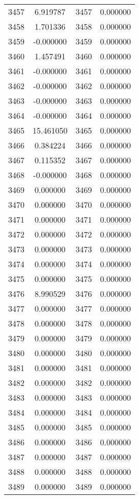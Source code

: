 \documentclass[12pt]{article}
\begin{document}
\begin{longtable}{@{}cccc@{}}
3457 & 6.919787 & 3457 & 0.000000 \\
3458 & 1.701336 & 3458 & 0.000000 \\
3459 & -0.000000 & 3459 & 0.000000 \\
3460 & 1.457491 & 3460 & 0.000000 \\
3461 & -0.000000 & 3461 & 0.000000 \\
3462 & -0.000000 & 3462 & 0.000000 \\
3463 & -0.000000 & 3463 & 0.000000 \\
3464 & -0.000000 & 3464 & 0.000000 \\
3465 & 15.461050 & 3465 & 0.000000 \\
3466 & 0.384224 & 3466 & 0.000000 \\
3467 & 0.115352 & 3467 & 0.000000 \\
3468 & -0.000000 & 3468 & 0.000000 \\
3469 & 0.000000 & 3469 & 0.000000 \\
3470 & 0.000000 & 3470 & 0.000000 \\
3471 & 0.000000 & 3471 & 0.000000 \\
3472 & 0.000000 & 3472 & 0.000000 \\
3473 & 0.000000 & 3473 & 0.000000 \\
3474 & 0.000000 & 3474 & 0.000000 \\
3475 & 0.000000 & 3475 & 0.000000 \\
3476 & 8.990529 & 3476 & 0.000000 \\
3477 & 0.000000 & 3477 & 0.000000 \\
3478 & 0.000000 & 3478 & 0.000000 \\
3479 & 0.000000 & 3479 & 0.000000 \\
3480 & 0.000000 & 3480 & 0.000000 \\
3481 & 0.000000 & 3481 & 0.000000 \\
3482 & 0.000000 & 3482 & 0.000000 \\
3483 & 0.000000 & 3483 & 0.000000 \\
3484 & 0.000000 & 3484 & 0.000000 \\
3485 & 0.000000 & 3485 & 0.000000 \\
3486 & 0.000000 & 3486 & 0.000000 \\
3487 & 0.000000 & 3487 & 0.000000 \\
3488 & 0.000000 & 3488 & 0.000000 \\
3489 & 0.000000 & 3489 & 0.000000 \\

\end{longtable}
\end{document}
